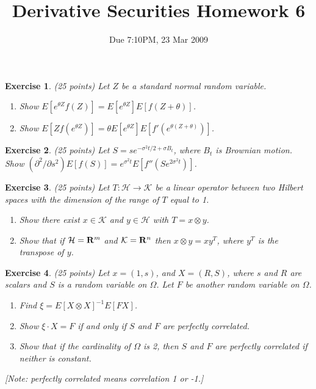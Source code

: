 \documentclass[11pt,fleqn]{amsproc}
\newcommand{\R}{{\bf R}}
\renewcommand{\H}{\mathcal{H}}
\newcommand{\K}{\mathcal{K}}
\newtheorem{xca}{Exercise}
\begin{document}
\title{Derivative Securities Homework 6}
\author{Due 7:10PM, 23 Mar 2009}

\maketitle

\begin{xca}{(25 points)}
Let $Z$ be a standard normal random variable. 
\begin{enumerate}
\item Show $E[e^{\theta Z} f(Z)] = E[e^{\theta Z}] E[f(Z + \theta)]$. 
\item Show $E[Z f(e^{\theta Z})] = \theta E[e^{\theta Z}] E[f'(e^{\theta (Z + \theta)})]$.
\end{enumerate}
\end{xca}


\begin{xca}{(25 points)}
Let $S = se^{-\sigma^2t/2 + \sigma B_t}$, where $B_t$ is Brownian motion.
Show $(\partial^2/\partial s^2) E[f(S)] = e^{\sigma^2 t} E[f''(Se^{2\sigma^2 t})]$. 
\end{xca}

\begin{xca}{(25 points)}
Let $T\colon\H\to\K$ be a linear operator between two Hilbert spaces with the dimension
of the range of $T$ equal to 1.
\begin{enumerate}
\item Show there exist $x\in\K$ and $y\in\H$ with $T = x\otimes y$.
\item Show that if $\H = \R^m$ and $\K = \R^n$ then $x\otimes y = xy^T$, where
$y^T$ is the transpose of $y$.
\end{enumerate}
\end{xca}

\begin{xca}{(25 points)}
Let $x = (1, s)$, and $X = (R, S)$, where $s$ and $R$ are scalars and 
$S$ is a random variable on $\Omega$.
Let $F$ be another random variable on $\Omega$.
\begin{enumerate}
\item Find $\xi = E[X\otimes X]^{-1} E[FX]$.
\item Show $\xi\cdot X = F$ if and only if $S$ and $F$ are perfectly correlated.
\item Show that if the cardinality of $\Omega$ is 2, then $S$ and $F$ are perfectly correlated
if neither is constant.
\end{enumerate}
[Note: perfectly correlated means correlation 1 or -1.]
\end{xca}
\end{document}
